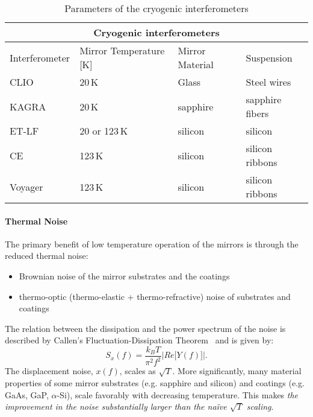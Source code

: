 \begin{table}[h]
\centering
\begin{tabular}{ |l||l|l|l|  }
 \hline
 \multicolumn{4}{|c|}{Cryogenic interferometers} \\
 \hline
 Interferometer & Mirror Temperature [K] & Mirror Material & Suspension \\
 \hline
 CLIO           &   20\,K           & Glass     &  Steel wires \\
 KAGRA          &   20\,K           & sapphire  &  sapphire fibers  \\
 ET-LF             &   20 or 123\,K    & silicon   &  silicon  \\
 CE             &   123\,K          & silicon   &  silicon ribbons \\
 Voyager        &   123\,K          & silicon   &  silicon ribbons \\

 \hline
\end{tabular}
\caption[Cryo IFOs]{Parameters of the cryogenic interferometers}
\label{}
\end{table}

\begin{tcolorbox}[standard jigsaw,colframe=ocre,colback=blanchedalmond!10!white,opacityback=0.6,coltext=black]
\paragraph{Thermal Noise}
The primary benefit of low temperature operation of the mirrors is through the reduced thermal noise:
\begin{itemize}
\item Brownian noise of the mirror substrates and the coatings
\item thermo-optic (thermo-elastic + thermo-refractive) noise of substrates and coatings
\end{itemize}
The relation between the dissipation and the power spectrum of the noise is described by Callen's Fluctuation-Dissipation Theorem~\cite{CaWe1951, Kubo:FDT, Callen:1959} and is given by:
\begin{equation}
S_x(f) = \frac{k_B T}{\pi^2 f^2} \left| Re \big[ Y(f) \big]\right|.
\label{eq:FDT}
\end{equation}
The displacement noise, $x(f)$, scales as $\sqrt{T}$. More significantly, many material properties of some mirror substrates (e.g. sapphire and silicon) and coatings (e.g. GaAs, GaP, $\alpha$-Si), scale favorably with decreasing temperature. This makes \emph{the improvement in the noise substantially larger than the na\"ive $\sqrt{T}$ scaling}.
\end{tcolorbox}

